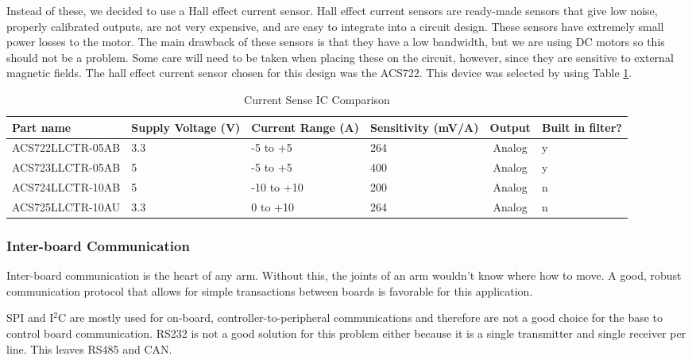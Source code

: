 \noindent Instead of these, we decided to use a Hall effect current sensor. Hall effect current sensors are ready-made sensors that give low noise, properly calibrated outputs, are not very expensive, and are easy to integrate into a circuit design. These sensors have extremely small power losses to the motor. The main drawback of these sensors is that they have a low bandwidth, but we are using DC motors so this should not be a problem. Some care will need to be taken when placing these on the circuit, however, since they are sensitive to external magnetic fields. The hall effect current sensor chosen for this design was the ACS722. This device was selected by using Table \ref{tbl:Current Sense IC Comparison}.

\begin{table}[H]
	\centering
	\caption{Current Sense IC Comparison}
	\begin{tabular}{|p{4.2cm}|p{1.5cm}|p{2cm}|p{1.7cm}|c|p{1.4cm}|}
\hline
Part name & Supply Voltage (V) & Current Range (A) & Sensitivity (mV/A) & Output & Built in filter? \\
\hline

ACS722LLCTR-05AB & 3.3 & -5 to +5 & 264 & Analog & y \\

ACS723LLCTR-05AB & 5 & -5 to +5 & 400 & Analog & y \\

ACS724LLCTR-10AB & 5 & -10 to +10 & 200 & Analog & n \\

ACS725LLCTR-10AU & 3.3 & 0 to +10 & 264 & Analog & n \\
\hline

\end{tabular}

	\label{tbl:Current Sense IC Comparison}
\end{table}

\subsubsection{Inter-board Communication}
Inter-board communication is the heart of any arm. Without this, the joints of an arm wouldn't know where how to move. A good, robust communication protocol that allows for simple transactions between boards is favorable for this application.

\noindent SPI and I$^2$C are mostly used for on-board, controller-to-peripheral communications and therefore are not a good choice for the base to control board communication. RS232 is not a good solution for this problem either because it is a single transmitter and single receiver per line. This leaves RS485 and CAN.

